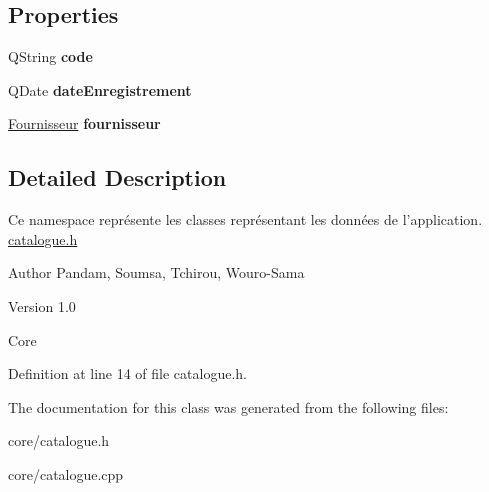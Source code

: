 \subsection*{Properties}
\begin{DoxyCompactItemize}
\item 
\hypertarget{class_catalogue_af6a7d07d582b533f6b1c6fcf19bbdde4}{
QString {\bfseries code}}
\label{db/d2b/class_catalogue_af6a7d07d582b533f6b1c6fcf19bbdde4}

\item 
\hypertarget{class_catalogue_a6ca6700b1886601020613672684348cf}{
QDate {\bfseries dateEnregistrement}}
\label{db/d2b/class_catalogue_a6ca6700b1886601020613672684348cf}

\item 
\hypertarget{class_catalogue_a5cd908ec7e2b86a67d4ae8dbe7fd7a68}{
\hyperlink{class_fournisseur}{Fournisseur} {\bfseries fournisseur}}
\label{db/d2b/class_catalogue_a5cd908ec7e2b86a67d4ae8dbe7fd7a68}

\end{DoxyCompactItemize}


\subsection{Detailed Description}
Ce namespace représente les classes représentant les données de l'application. \hyperlink{catalogue_8h_source}{catalogue.h} \begin{DoxyAuthor}{Author}
Pandam, Soumsa, Tchirou, Wouro-\/Sama 
\end{DoxyAuthor}
\begin{DoxyVersion}{Version}
1.0
\end{DoxyVersion}
Core 

Definition at line 14 of file catalogue.h.



The documentation for this class was generated from the following files:\begin{DoxyCompactItemize}
\item 
core/catalogue.h\item 
core/catalogue.cpp\end{DoxyCompactItemize}
